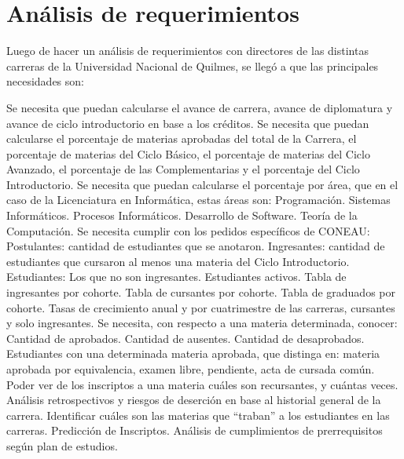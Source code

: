 \section[Análisis de requerimientos]{Análisis de requerimientos}

Luego de hacer un análisis de requerimientos con directores de las distintas carreras de la Universidad Nacional de Quilmes, se llegó a que las principales necesidades son:

\begin{outline}
    \1 Se necesita que puedan calcularse el avance de carrera, avance de diplomatura y avance de ciclo introductorio en base a los créditos.
    \1 Se necesita que puedan calcularse el porcentaje de materias aprobadas del total de la Carrera, el porcentaje de materias del Ciclo Básico, el porcentaje de materias del Ciclo Avanzado, el porcentaje de las Complementarias y el porcentaje del Ciclo Introductorio.
    \1 Se necesita que puedan calcularse el porcentaje por área, que en el caso de la Licenciatura en Informática, estas áreas son: 
        \2 Programación.
        \2 Sistemas Informáticos.
        \2 Procesos Informáticos.
        \2 Desarrollo de Software.
        \2 Teoría de la Computación.
    \1 Se necesita cumplir con los pedidos específicos de CONEAU:
        \2 Postulantes: cantidad de estudiantes que se anotaron.
        \2 Ingresantes: cantidad de estudiantes que cursaron al menos una materia del Ciclo Introductorio.
        \2 Estudiantes: Los que no son ingresantes. Estudiantes activos.
        \2 Tabla de ingresantes por cohorte.
        \2 Tabla de cursantes por cohorte.
        \2 Tabla de graduados por cohorte.
        \2 Tasas de crecimiento anual y por cuatrimestre de las carreras, cursantes y solo ingresantes.
    \1 Se necesita, con respecto a una materia determinada, conocer:
        \2 Cantidad de aprobados.
        \2 Cantidad de ausentes.
        \2 Cantidad de desaprobados.
    \1 Estudiantes con una determinada materia aprobada, que distinga en: materia aprobada por equivalencia, examen libre, pendiente, acta de cursada común.
    \1 Poder ver de los inscriptos a una materia cuáles son recursantes, y cuántas veces.
    \1 Análisis retrospectivos y riesgos de deserción en base al historial general de la carrera.
    \1 Identificar cuáles son las materias que “traban” a los estudiantes en las carreras. 
    \1 Predicción de Inscriptos.
    \1 Análisis de cumplimientos de prerrequisitos según plan de estudios.
    
    
        
\end{outline}

